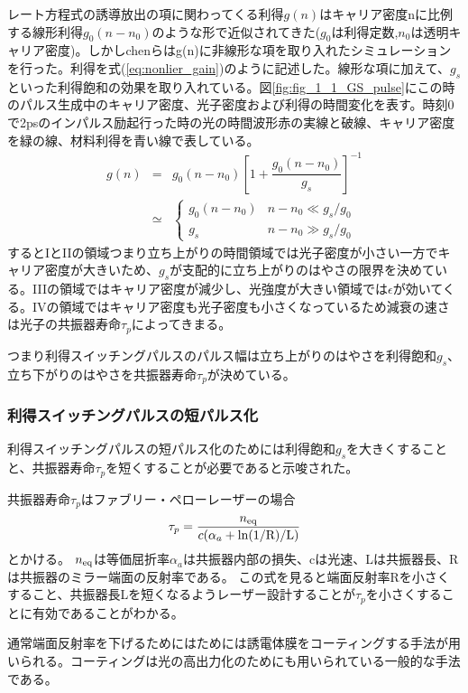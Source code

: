 レート方程式の誘導放出の項に関わってくる利得$g(n)$はキャリア密度nに比例する線形利得$g_{0}(n-n_{0})$のような形で近似されてきた($g_{0}$は利得定数,$n_{0}$は透明キャリア密度)。しかしchenらはg(n)に非線形な項を取り入れたシミュレーションを行った。利得を式(\ref{eq:nonlier_gain})のように記述した。線形な項に加えて、$g_{s}$といった利得飽和の効果を取り入れている。図\ref{fig:fig_1_1_GS_pulse}にこの時のパルス生成中のキャリア密度、光子密度および利得の時間変化を表す。時刻0で2psのインパルス励起行った時の光の時間波形赤の実線と破線、キャリア密度を緑の線、材料利得を青い線で表している。
\begin{eqnarray}
g(n)&=&g_{0}(n-n_{0})\left[1+\dfrac{g_{0}(n-n_{0})}{g_{s}}\right]^{-1}\\
\label{eq:nonlier_gain}
&\simeq &\left\{
\begin{array}{ll}
 g_{0}(n-n_{0}) & n-n_{0}\ll g_{s}/g_{0}\nonumber \\
g_{s} & n-n_{0}\gg g_{s}/g_{0}\nonumber
\end{array}
\right.
\end{eqnarray}
するとIとIIの領域つまり立ち上がりの時間領域では光子密度が小さい一方でキャリア密度が大きいため、$g_{s}$が支配的に立ち上がりのはやさの限界を決めている。IIIの領域ではキャリア密度が減少し、光強度が大きい領域では$\epsilon$が効いてくる。IVの領域ではキャリア密度も光子密度も小さくなっているため減衰の速さは光子の共振器寿命$\tau_{p}$によってきまる。

つまり利得スイッチングパルスのパルス幅は立ち上がりのはやさを利得飽和$g_{s}$、立ち下がりのはやさを共振器寿命$\tau_{p}$が決めている。
\newpage

\subsubsection{利得スイッチングパルスの短パルス化}
利得スイッチングパルスの短パルス化のためには利得飽和$g_{s}$を大きくすることと、共振器寿命$\tau_{p}$を短くすることが必要であると示唆された。

共振器寿命$\tau_{p}$はファブリー・ペローレーザーの場合
\begin{eqnarray}
\tau_{p}=\dfrac{n_{\rm{eq}}}{c(\alpha_{a}+\rm{ln}(1/R)/L)}
\end{eqnarray}
とかける\cite{ref_iga}。
$n_{\rm{eq}}$は等価屈折率$\alpha_{a}$は共振器内部の損失、cは光速、Lは共振器長、Rは共振器のミラー端面の反射率である。
この式を見ると端面反射率Rを小さくすること、共振器長Lを短くなるようレーザー設計することが$\tau_{p}$を小さくすることに有効であることがわかる。

通常端面反射率を下げるためにはためには誘電体膜をコーティングする手法が用いられる。コーティングは光の高出力化のためにも用いられている一般的な手法である。

